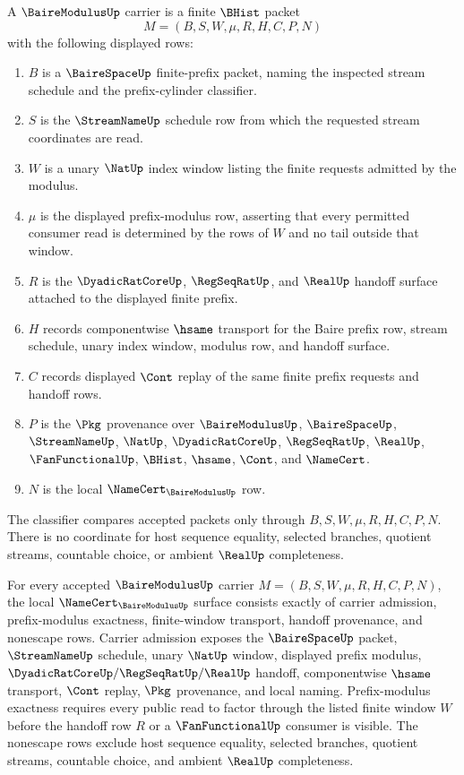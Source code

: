 \begin{definition}
\label{def:baire-modulus-carrier}
A $\BaireModulusUp$ carrier is a finite $\BHist$ packet
$$
M=(B,S,W,\mu,R,H,C,P,N)
$$
with the following displayed rows:
\begin{enumerate}
\item $B$ is a $\BaireSpaceUp$ finite-prefix packet, naming the inspected stream schedule and the prefix-cylinder classifier.
\item $S$ is the $\StreamNameUp$ schedule row from which the requested stream coordinates are read.
\item $W$ is a unary $\NatUp$ index window listing the finite requests admitted by the modulus.
\item $\mu$ is the displayed prefix-modulus row, asserting that every permitted consumer read is determined by the rows of $W$ and no tail outside that window.
\item $R$ is the $\DyadicRatCoreUp$, $\RegSeqRatUp$, and $\RealUp$ handoff surface attached to the displayed finite prefix.
\item $H$ records componentwise $\hsame$ transport for the Baire prefix row, stream schedule, unary index window, modulus row, and handoff surface.
\item $C$ records displayed $\Cont$ replay of the same finite prefix requests and handoff rows.
\item $P$ is the $\Pkg$ provenance over $\BaireModulusUp$, $\BaireSpaceUp$, $\StreamNameUp$, $\NatUp$, $\DyadicRatCoreUp$, $\RegSeqRatUp$, $\RealUp$, $\FanFunctionalUp$, $\BHist$, $\hsame$, $\Cont$, and $\NameCert$.
\item $N$ is the local $\NameCert_{\BaireModulusUp}$ row.
\end{enumerate}
The classifier compares accepted packets only through $B,S,W,\mu,R,H,C,P,N$. There is no coordinate for host sequence equality, selected branches, quotient streams, countable choice, or ambient $\RealUp$ completeness.
\end{definition}
\begin{theorem}
\label{thm:baire-modulus-namecert-obligations}
For every accepted $\BaireModulusUp$ carrier $M=(B,S,W,\mu,R,H,C,P,N)$, the local $\NameCert_{\BaireModulusUp}$ surface consists exactly of carrier admission, prefix-modulus exactness, finite-window transport, handoff provenance, and nonescape rows. Carrier admission exposes the $\BaireSpaceUp$ packet, $\StreamNameUp$ schedule, unary $\NatUp$ window, displayed prefix modulus, $\DyadicRatCoreUp/\RegSeqRatUp/\RealUp$ handoff, componentwise $\hsame$ transport, $\Cont$ replay, $\Pkg$ provenance, and local naming. Prefix-modulus exactness requires every public read to factor through the listed finite window $W$ before the handoff row $R$ or a $\FanFunctionalUp$ consumer is visible. The nonescape rows exclude host sequence equality, selected branches, quotient streams, countable choice, and ambient $\RealUp$ completeness.
\end{theorem}
